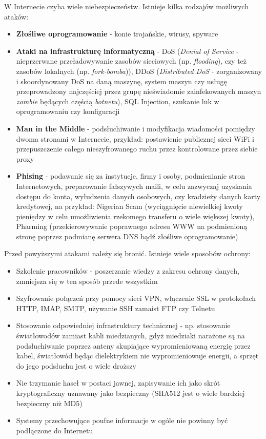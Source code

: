 W Internecie czyha wiele niebezpieczeństw. Istnieje kilka rodzajów możliwych ataków:
\begin{itemize}
	\item \textbf{Złośliwe oprogramowanie} - konie trojańskie, wirusy, spyware
    \item \textbf{Ataki na infrastrukturę informatyczną} - DoS (\textit{Denial of Service} - nieprzerwane przeładowywanie zasobów sieciowych (np. \textit{flooding}), czy też zasobów lokalnych (np. \textit{fork-bomba})), DDoS (\textit{Distributed DoS} - zorganizowany i skoordynowany DoS na daną maszynę, system maszyn czy usługę przeprowadzony najczęściej przez grupę nieświadomie zainfekowanych maszyn \textit{zombie} będących częścią \textit{botnetu}), SQL Injection, szukanie luk w oprogramowaniu czy konfiguracji
    \item \textbf{Man in the Middle} - podsłuchiwanie i modyfikacja wiadomości pomiędzy dwoma stronami w Internecie, przykład: postawienie publicznej sieci WiFi i przepuszczenie całego nieszyfrowanego ruchu przez kontrolowane przez siebie proxy
    \item \textbf{Phising} - podawanie się za instytucje, firmy i osoby, podmienianie stron Internetowych, preparowanie fałszywych maili, w celu zazwyczaj uzyskania dostępu do konta, wyłudzenia danych osobowych, czy kradzieży danych karty kredytowej, na przykład: Nigerian Scam (wyciągnięcie niewielkiej kwoty pieniędzy w celu umożliwienia rzekomego transferu o wiele większej kwoty), Pharming (przekierowywanie poprawnego adresu WWW na podmienioną stronę poprzez podmianę serwera DNS bądź złośliwe oprogramowanie)
\end{itemize}

Przed powyższymi atakami należy się bronić. Istnieje wiele sposobów ochrony:
\begin{itemize}
	\item Szkolenie pracowników - poszerzanie wiedzy z zakresu ochrony danych, zmniejsza się w ten sposób przede wszystkim 
    \item Szyfrowanie połączeń przy pomocy sieci VPN, włączenie SSL w protokołach HTTP, IMAP, SMTP, używanie SSH zamaist FTP czy Telnetu
    \item Stosowanie odpowiedniej infrastruktury technicznej - np. stosowanie światłowodów zamiast kabli miedzianych, gdyż miedziaki narażone są na podsłuchiwanie poprzez anteny skupiające wypromieniowaną energię przez kabel, światłowód będąc dielektrykiem nie wypromieniowuje energii, a sprzęt do jego podsłuchu jest o wiele droższy
    \item Nie trzymanie haseł w postaci jawnej, zapisywanie ich jako skrót kryptograficzny uznawany jako bezpieczny (SHA512 jest o wiele bardziej bezpieczny niż MD5)
    \item Systemy przechowujące poufne informacje w ogóle nie powinny być podłączone do Internetu
\end{itemize}

